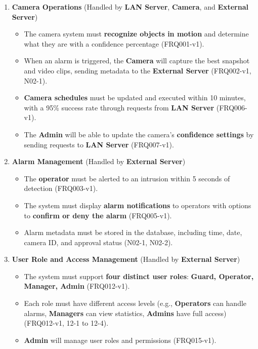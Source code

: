 \documentclass{article}
\begin{document}
\begin{enumerate}
    \item \textbf{Camera Operations} (Handled by \textbf{LAN Server}, \textbf{Camera}, and \textbf{External Server})
    \begin{itemize}
        \item The camera system must \textbf{recognize objects in motion} and determine what they are with a confidence percentage (FRQ001-v1).
        \item When an alarm is triggered, the \textbf{Camera} will capture the best snapshot and video clips, sending metadata to the \textbf{External Server} (FRQ002-v1, N02-1).
        \item \textbf{Camera schedules} must be updated and executed within 10 minutes, with a 95\% success rate through requests from \textbf{LAN Server} (FRQ006-v1).
        \item The \textbf{Admin} will be able to update the camera’s \textbf{confidence settings} by sending requests to \textbf{LAN Server} (FRQ007-v1).
    \end{itemize}
    \item \textbf{Alarm Management} (Handled by \textbf{External Server})
    \begin{itemize}
        \item The \textbf{operator} must be alerted to an intrusion within 5 seconds of detection (FRQ003-v1).
        \item The system must display \textbf{alarm notifications} to operators with options to \textbf{confirm or deny the alarm} (FRQ005-v1).
        \item Alarm metadata must be stored in the database, including time, date, camera ID, and approval status (N02-1, N02-2).
    \end{itemize}
    \item \textbf{User Role and Access Management} (Handled by \textbf{External Server})
    \begin{itemize}
        \item The system must support \textbf{four distinct user roles}: \textbf{Guard, Operator, Manager, Admin} (FRQ012-v1).
        \item Each role must have different access levels (e.g., \textbf{Operators} can handle alarms, \textbf{Managers} can view statistics, \textbf{Admins} have full access) (FRQ012-v1, 12-1 to 12-4).
        \item \textbf{Admin} will manage user roles and permissions (FRQ015-v1).
    \end{itemize}

\end{enumerate}
\end{document}

